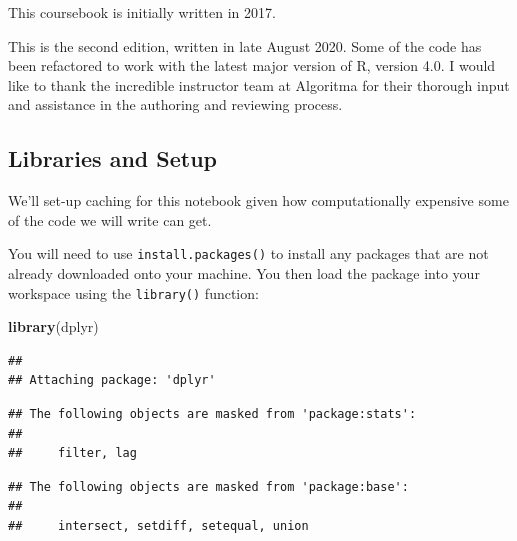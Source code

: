 \documentclass[]{article}
\newenvironment{Shaded}{\begin{snugshade}}{\end{snugshade}}
\newcommand{\DataTypeTok}[1]{\textcolor[rgb]{0.13,0.29,0.53}{#1}}
\newcommand{\DecValTok}[1]{\textcolor[rgb]{0.00,0.00,0.81}{#1}}
\newcommand{\KeywordTok}[1]{\textcolor[rgb]{0.13,0.29,0.53}{\textbf{#1}}}
\newcommand{\NormalTok}[1]{#1}
\newcommand{\OperatorTok}[1]{\textcolor[rgb]{0.81,0.36,0.00}{\textbf{#1}}}
\newcommand{\OtherTok}[1]{\textcolor[rgb]{0.56,0.35,0.01}{#1}}
\begin{document}
This coursebook is initially written in 2017.

This is the second edition, written in late August 2020. Some of the
code has been refactored to work with the latest major version of R,
version 4.0. I would like to thank the incredible instructor team at
Algoritma for their thorough input and assistance in the authoring and
reviewing process.

\hypertarget{libraries-and-setup}{%
\subsection{Libraries and Setup}\label{libraries-and-setup}}

We'll set-up caching for this notebook given how computationally
expensive some of the code we will write can get.

\begin{Shaded}
\end{Shaded}

You will need to use \texttt{install.packages()} to install any packages
that are not already downloaded onto your machine. You then load the
package into your workspace using the \texttt{library()} function:

\begin{Shaded}
\begin{Highlighting}[]
\KeywordTok{library}\NormalTok{(dplyr)}
\end{Highlighting}
\end{Shaded}

\begin{verbatim}
## 
## Attaching package: 'dplyr'
\end{verbatim}

\begin{verbatim}
## The following objects are masked from 'package:stats':
## 
##     filter, lag
\end{verbatim}

\begin{verbatim}
## The following objects are masked from 'package:base':
## 
##     intersect, setdiff, setequal, union
\end{verbatim}
\end{document}
